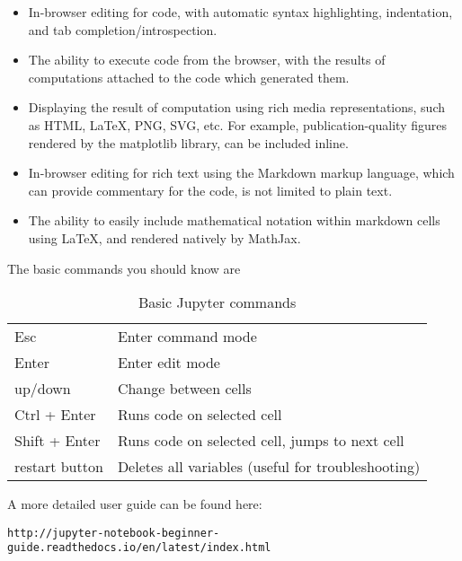 \begin{itemize}

\item In-browser editing for code, with automatic syntax highlighting, indentation, and tab completion/introspection.

\item The ability to execute code from the browser, with the results of computations attached to the code which generated them.

\item Displaying the result of computation using rich media representations, such as HTML, LaTeX, PNG, SVG, etc. For example, publication-quality figures rendered by the matplotlib library, can be included inline.

\item In-browser editing for rich text using the Markdown markup language, which can provide commentary for the code, is not limited to plain text.

\item The ability to easily include mathematical notation within markdown cells using LaTeX, and rendered natively by MathJax.

\end{itemize}

\noindent The basic commands you should know are

\begin{table}[!h]
\begin{center}
\begin{tabular}{|l|l|}
\hline
Esc              & Enter command mode\\
Enter            & Enter edit mode\\
\hline
up/down          & Change between cells\\
Ctrl + Enter     & Runs code on selected cell\\
Shift + Enter    & Runs code on selected cell, jumps to next cell\\
\hline
restart button   & Deletes all variables (useful for troubleshooting)\\ 
\hline
\end{tabular}
\end{center}
\caption{\label{tb::jupyterbasiccommands}Basic Jupyter commands}
\end{table}

\noindent A more detailed user guide can be found here:

\begin{verbatim}
http://jupyter-notebook-beginner-guide.readthedocs.io/en/latest/index.html
\end{verbatim}
